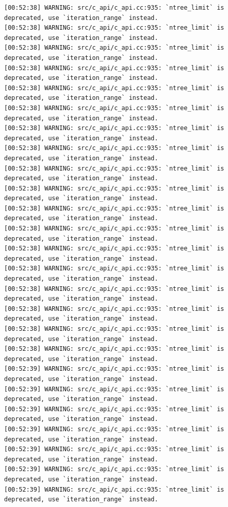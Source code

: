 \documentclass[
  letterpaper,
  DIV=11,
  numbers=noendperiod]{scrartcl}
\begin{document}
\begin{verbatim}
[00:52:38] WARNING: src/c_api/c_api.cc:935: `ntree_limit` is deprecated, use `iteration_range` instead.
[00:52:38] WARNING: src/c_api/c_api.cc:935: `ntree_limit` is deprecated, use `iteration_range` instead.
[00:52:38] WARNING: src/c_api/c_api.cc:935: `ntree_limit` is deprecated, use `iteration_range` instead.
[00:52:38] WARNING: src/c_api/c_api.cc:935: `ntree_limit` is deprecated, use `iteration_range` instead.
[00:52:38] WARNING: src/c_api/c_api.cc:935: `ntree_limit` is deprecated, use `iteration_range` instead.
[00:52:38] WARNING: src/c_api/c_api.cc:935: `ntree_limit` is deprecated, use `iteration_range` instead.
[00:52:38] WARNING: src/c_api/c_api.cc:935: `ntree_limit` is deprecated, use `iteration_range` instead.
[00:52:38] WARNING: src/c_api/c_api.cc:935: `ntree_limit` is deprecated, use `iteration_range` instead.
[00:52:38] WARNING: src/c_api/c_api.cc:935: `ntree_limit` is deprecated, use `iteration_range` instead.
[00:52:38] WARNING: src/c_api/c_api.cc:935: `ntree_limit` is deprecated, use `iteration_range` instead.
[00:52:38] WARNING: src/c_api/c_api.cc:935: `ntree_limit` is deprecated, use `iteration_range` instead.
[00:52:38] WARNING: src/c_api/c_api.cc:935: `ntree_limit` is deprecated, use `iteration_range` instead.
[00:52:38] WARNING: src/c_api/c_api.cc:935: `ntree_limit` is deprecated, use `iteration_range` instead.
[00:52:38] WARNING: src/c_api/c_api.cc:935: `ntree_limit` is deprecated, use `iteration_range` instead.
[00:52:38] WARNING: src/c_api/c_api.cc:935: `ntree_limit` is deprecated, use `iteration_range` instead.
[00:52:38] WARNING: src/c_api/c_api.cc:935: `ntree_limit` is deprecated, use `iteration_range` instead.
[00:52:38] WARNING: src/c_api/c_api.cc:935: `ntree_limit` is deprecated, use `iteration_range` instead.
[00:52:38] WARNING: src/c_api/c_api.cc:935: `ntree_limit` is deprecated, use `iteration_range` instead.
[00:52:39] WARNING: src/c_api/c_api.cc:935: `ntree_limit` is deprecated, use `iteration_range` instead.
[00:52:39] WARNING: src/c_api/c_api.cc:935: `ntree_limit` is deprecated, use `iteration_range` instead.
[00:52:39] WARNING: src/c_api/c_api.cc:935: `ntree_limit` is deprecated, use `iteration_range` instead.
[00:52:39] WARNING: src/c_api/c_api.cc:935: `ntree_limit` is deprecated, use `iteration_range` instead.
[00:52:39] WARNING: src/c_api/c_api.cc:935: `ntree_limit` is deprecated, use `iteration_range` instead.
[00:52:39] WARNING: src/c_api/c_api.cc:935: `ntree_limit` is deprecated, use `iteration_range` instead.
[00:52:39] WARNING: src/c_api/c_api.cc:935: `ntree_limit` is deprecated, use `iteration_range` instead.

\end{verbatim}
\end{document}
